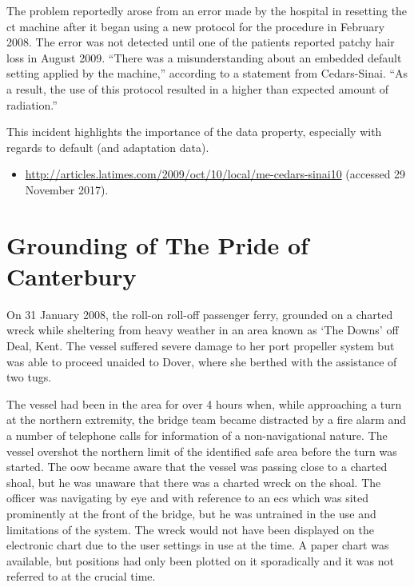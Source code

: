 The problem reportedly arose from an error made by the hospital in resetting the \gls{ct} machine after it began using a new protocol for the procedure in February 2008. The error was not detected until one of the patients reported patchy hair loss in August 2009. ``There was a misunderstanding about an embedded default setting applied by the machine,'' according to a statement from Cedars-Sinai. ``As a result, the use of this protocol resulted in a higher than expected amount of radiation.'' 

This incident highlights the importance of the  \gls{data property}, especially with regards to default (and \gls{adaptation data}).

\begin{samepage}
\begin{itemize}
  \item \raggedright{\href{http://articles.latimes.com/2009/oct/10/local/me-cedars-sinai10}{http://articles.latimes.com/2009/oct/10/local/me-cedars-sinai10} (accessed 29 November 2017).}
\end{itemize}
\end{samepage}


\section{Grounding of The Pride of Canterbury} \label{bkm:incacc:canterbury}
On 31 January 2008, the roll-on roll-off passenger ferry,  grounded on a charted wreck while sheltering from heavy weather in an area known as `The Downs' off Deal, Kent. The vessel suffered severe damage to her port propeller system but was able to proceed unaided to Dover, where she berthed with the assistance of two tugs.

The vessel had been in the area for over 4 hours when, while approaching a turn at the northern extremity, the bridge team became distracted by a fire alarm and a number of telephone calls for \gls{information} of a non-navigational nature. The vessel overshot the northern limit of the identified safe area before the turn was started. The \gls{oow} became aware that the vessel was passing close to a charted shoal, but he was unaware that there was a charted wreck on the shoal. The officer was navigating by eye and with reference to an \gls{ecs} which was sited prominently at the front of the bridge, but he was untrained in the use and limitations of the system. The wreck would not have been displayed on the electronic chart due to the user settings in use at the time. A paper chart was available, but positions had only been plotted on it sporadically and it was not referred to at the crucial time.

